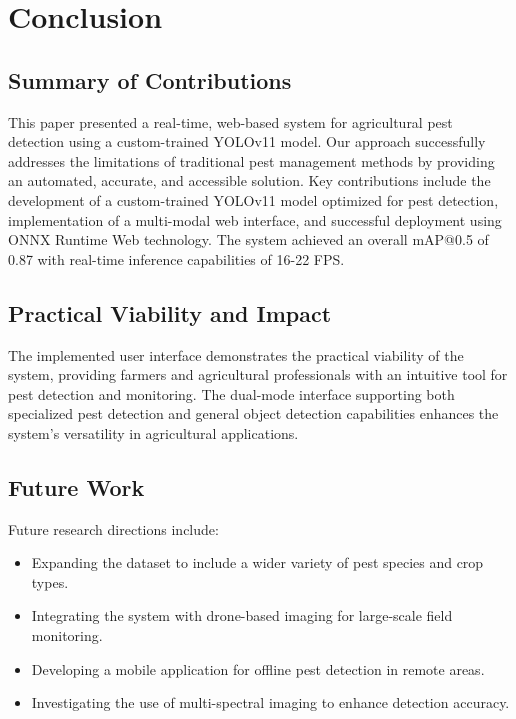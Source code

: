 \section{Conclusion}
\label{sec:conclusion}

\subsection{Summary of Contributions}
This paper presented a real-time, web-based system for agricultural pest detection using a custom-trained YOLOv11 model. Our approach successfully addresses the limitations of traditional pest management methods by providing an automated, accurate, and accessible solution. Key contributions include the development of a custom-trained YOLOv11 model optimized for pest detection, implementation of a multi-modal web interface, and successful deployment using ONNX Runtime Web technology. The system achieved an overall mAP@0.5 of 0.87 with real-time inference capabilities of 16-22 FPS.

\subsection{Practical Viability and Impact}
The implemented user interface demonstrates the practical viability of the system, providing farmers and agricultural professionals with an intuitive tool for pest detection and monitoring. The dual-mode interface supporting both specialized pest detection and general object detection capabilities enhances the system's versatility in agricultural applications.

\subsection{Future Work}
Future research directions include:
\begin{itemize}
    \item Expanding the dataset to include a wider variety of pest species and crop types.
    \item Integrating the system with drone-based imaging for large-scale field monitoring.
    \item Developing a mobile application for offline pest detection in remote areas.
    \item Investigating the use of multi-spectral imaging to enhance detection accuracy.
\end{itemize}
